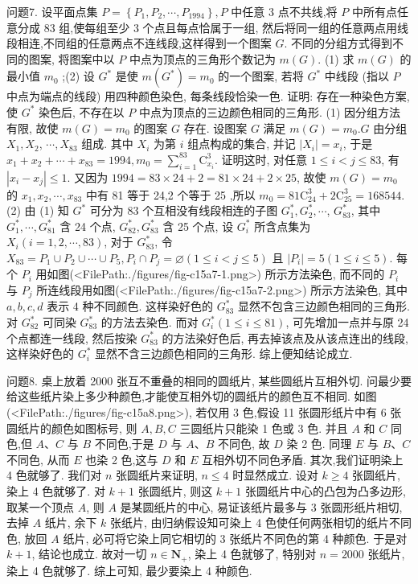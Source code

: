 问题7. 设平面点集 $P=\left\{P_1, P_2, \cdots, P_{1994}\right\}, P$ 中任意 3 点不共线,将 $P$ 中所有点任意分成 83 组,使每组至少 3 个点且每点恰属于一组, 然后将同一组的任意两点用线段相连,不同组的任意两点不连线段,这样得到一个图案 $G$. 不同的分组方式得到不同的图案, 将图案中以 $P$ 中点为顶点的三角形个数记为 $m(G)$. (1) 求 $m(G)$ 的最小值 $m_0$ ;(2) 设 $G^*$ 是使 $m\left(G^*\right)=m_0$ 的一个图案, 若将 $G^*$ 中线段 (指以 $P$ 中点为端点的线段) 用四种颜色染色, 每条线段恰染一色.
证明: 存在一种染色方案,使 $G^*$ 染色后, 不存在以 $P$ 中点为顶点的三边颜色相同的三角形.
(1) 因分组方法有限, 故使 $m(G)=m_0$ 的图案 $G$ 存在.
设图案 $G$ 满足 $m(G)=m_0 . G$ 由分组 $X_1, X_2$, $\cdots, X_{83}$ 组成.
其中 $X_i$ 为第 $i$ 组点构成的集合, 并记 $\left|X_i\right|=x_i$, 于是 $x_1+ x_2+\cdots+x_{83}=1994, m_0=\sum_{i=1}^{83} \mathrm{C}_{x_i}^3$.
证明这时, 对任意 $1 \leqslant i<j \leqslant 83$, 有 $\left|x_i-x_j\right| \leqslant 1$. 又因为 $1994=83 \times 24+2=81 \times 24+ 2 \times 25$, 故使 $m(G)=m_0$ 的 $x_1, x_2, \cdots, x_{83}$ 中有 81 等于 24,2 个等于 25 ,所以 $m_0=81 \mathrm{C}_{24}^3+2 \mathrm{C}_{25}^3=168544$.
(2) 由 (1) 知 $G^*$ 可分为 83 个互相没有线段相连的子图 $G_1^*, G_2^*, \cdots$, $G_{83}^*$, 其中 $G_1^*, \cdots, G_{81}^*$ 含 24 个点, $G_{82}^*, G_{83}^*$ 含 25 个点, 设 $G_i^*$ 所含点集为 $X_i(i=1,2, \cdots, 83)$, 对于 $G_{83}^*$, 令 $X_{83}=P_1 \cup P_2 \cup \cdots \cup P_5, P_i \cap P_j= \varnothing(1 \leqslant i<j \leqslant 5)$ 且 $\left|P_i\right|=5(1 \leqslant i \leqslant 5)$. 每个 $P_i$ 用如图(<FilePath:./figures/fig-c15a7-1.png>) 所示方法染色, 而不同的 $P_i$ 与 $P_j$ 所连线段用如图(<FilePath:./figures/fig-c15a7-2.png>) 所示方法染色, 其中 $a, b, c, d$ 表示 4 种不同颜色.
这样染好色的 $G_{83}^*$ 显然不包含三边颜色相同的三角形.
对 $G_{82}^*$ 可同染 $G_{83}^*$ 的方法去染色.
而对 $G_i^*(1 \leqslant i \leqslant 81)$, 可先增加一点并与原 24 个点都连一线段, 然后按染 $G_{83}^*$ 的方法染好色后, 再去掉该点及从该点连出的线段,这样染好色的 $G_i^*$ 显然不含三边颜色相同的三角形.
综上便知结论成立.



问题8. 桌上放着 2000 张互不重叠的相同的圆纸片, 某些圆纸片互相外切.
问最少要给这些纸片染上多少种颜色,才能使互相外切的圆纸片的颜色互不相同.
如图(<FilePath:./figures/fig-c15a8.png>), 若仅用 3 色,假设 11 张圆形纸片中有 6 张圆纸片的颜色如图标号, 则 $A, B, C$ 三圆纸片只能染 1 色或 3 色.
并且 $A$ 和 $C$ 同色,但 $A 、 C$ 与 $B$ 不同色,于是 $D$ 与 $A 、 B$ 不同色, 故 $D$ 染 2 色.
同理 $E$ 与 $B 、 C$ 不同色, 从而 $E$ 也染 2 色,这与 $D$ 和 $E$ 互相外切不同色矛盾.
其次,我们证明染上 4 色就够了.
我们对 $n$ 张圆纸片来证明, $n \leqslant 4$ 时显然成立.
设对 $k \geqslant 4$ 张圆纸片, 染上 4 色就够了.
对 $k+1$ 张圆纸片, 则这 $k+1$ 张圆纸片中心的凸包为凸多边形, 取某一个顶点 $A$, 则 $A$ 是某圆纸片的中心, 易证该纸片最多与 3 张圆形纸片相切, 去掉 $A$ 纸片, 余下 $k$ 张纸片, 由归纳假设知可染上 4 色使任何两张相切的纸片不同色, 放回 $A$ 纸片, 必可将它染上同它相切的 3 张纸片不同色的第 4 种颜色.
于是对 $k+1$, 结论也成立.
故对一切 $n \in \mathbf{N}_{+}$, 染上 4 色就够了, 特别对 $n=2000$ 张纸片, 染上 4 色就够了.
综上可知, 最少要染上 4 种颜色.


